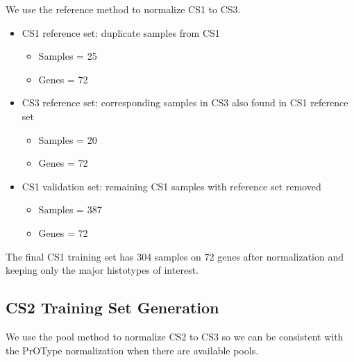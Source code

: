 \documentclass[
]{report}
\providecommand{\tightlist}{%
  \setlength{\itemsep}{0pt}\setlength{\parskip}{0pt}}
\begin{document}
We use the reference method to normalize CS1 to CS3.

\begin{itemize}
\tightlist
\item
  CS1 reference set: duplicate samples from CS1

  \begin{itemize}
  \tightlist
  \item
    Samples = 25
  \item
    Genes = 72
  \end{itemize}
\item
  CS3 reference set: corresponding samples in CS3 also found in CS1 reference set

  \begin{itemize}
  \tightlist
  \item
    Samples = 20
  \item
    Genes = 72
  \end{itemize}
\item
  CS1 validation set: remaining CS1 samples with reference set removed

  \begin{itemize}
  \tightlist
  \item
    Samples = 387
  \item
    Genes = 72
  \end{itemize}
\end{itemize}

The final CS1 training set has 304 samples on 72 genes after normalization and keeping only the major histotypes of interest.

\hypertarget{cs2-training-set-generation}{%
\subsection{CS2 Training Set Generation}\label{cs2-training-set-generation}}

We use the pool method to normalize CS2 to CS3 so we can be consistent with the PrOType normalization when there are available pools.
\end{document}
